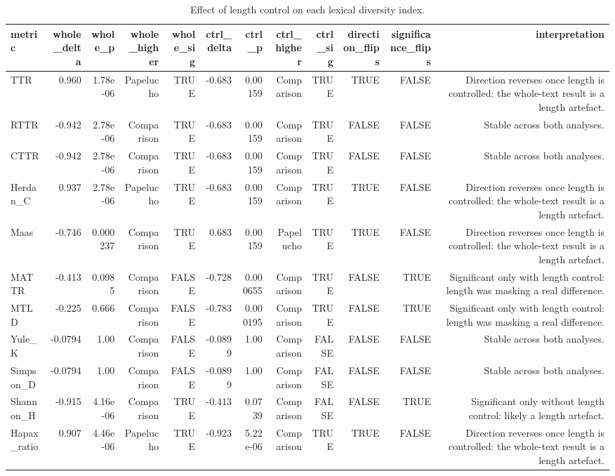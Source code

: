 \begin{table}[htbp]
\centering
\small
\caption{Effect of length control on each lexical diversity index.}
\label{tab:lexical-contrast}
\begin{tabular}{lrrrrrrrrrrr}
\toprule
\textbf{metric} & \textbf{whole\_delta} & \textbf{whole\_p} & \textbf{whole\_higher} & \textbf{whole\_sig} & \textbf{ctrl\_delta} & \textbf{ctrl\_p} & \textbf{ctrl\_higher} & \textbf{ctrl\_sig} & \textbf{direction\_flips} & \textbf{significance\_flips} & \textbf{interpretation} \\
\midrule
TTR & 0.960 & 1.78e-06 & Papelucho & TRUE & -0.683 & 0.00159 & Comparison & TRUE & TRUE & FALSE & Direction reverses once length is controlled: the whole-text result is a length artefact. \\
RTTR & -0.942 & 2.78e-06 & Comparison & TRUE & -0.683 & 0.00159 & Comparison & TRUE & FALSE & FALSE & Stable across both analyses. \\
CTTR & -0.942 & 2.78e-06 & Comparison & TRUE & -0.683 & 0.00159 & Comparison & TRUE & FALSE & FALSE & Stable across both analyses. \\
Herdan\_C & 0.937 & 2.78e-06 & Papelucho & TRUE & -0.683 & 0.00159 & Comparison & TRUE & TRUE & FALSE & Direction reverses once length is controlled: the whole-text result is a length artefact. \\
Maas & -0.746 & 0.000237 & Comparison & TRUE & 0.683 & 0.00159 & Papelucho & TRUE & TRUE & FALSE & Direction reverses once length is controlled: the whole-text result is a length artefact. \\
MATTR & -0.413 & 0.0985 & Comparison & FALSE & -0.728 & 0.000655 & Comparison & TRUE & FALSE & TRUE & Significant only with length control: length was masking a real difference. \\
MTLD & -0.225 & 0.666 & Comparison & FALSE & -0.783 & 0.000195 & Comparison & TRUE & FALSE & TRUE & Significant only with length control: length was masking a real difference. \\
Yule\_K & -0.0794 & 1.00 & Comparison & FALSE & -0.0899 & 1.00 & Comparison & FALSE & FALSE & FALSE & Stable across both analyses. \\
Simpson\_D & -0.0794 & 1.00 & Comparison & FALSE & -0.0899 & 1.00 & Comparison & FALSE & FALSE & FALSE & Stable across both analyses. \\
Shannon\_H & -0.915 & 4.16e-06 & Comparison & TRUE & -0.413 & 0.0739 & Comparison & FALSE & FALSE & TRUE & Significant only without length control: likely a length artefact. \\
Hapax\_ratio & 0.907 & 4.46e-06 & Papelucho & TRUE & -0.923 & 5.22e-06 & Comparison & TRUE & TRUE & FALSE & Direction reverses once length is controlled: the whole-text result is a length artefact. \\
\bottomrule
\end{tabular}
\end{table}

